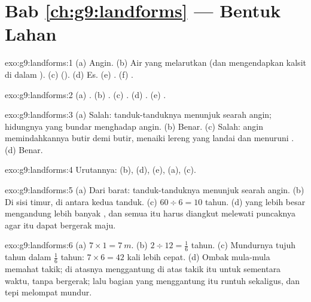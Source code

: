 \section*{Bab \ref{ch:g9:landforms} --- Bentuk Lahan}

\begin{solution}{exo:g9:landforms:1}
(a) Angin. (b) Air yang melarutkan  (dan mengendapkan kalsit di dalam
). (c)  (). (d) Es. (e) . (f) .
\end{solution}

\begin{solution}{exo:g9:landforms:2}
(a) . (b) . (c) . (d) . (e) .
\end{solution}

\begin{solution}{exo:g9:landforms:3}
(a) Salah: tanduk-tanduknya menunjuk searah angin; hidungnya yang bundar
menghadap angin. (b) Benar. (c) Salah: angin memindahkannya butir demi
butir, menaiki lereng yang landai dan menuruni . (d) Benar.
\end{solution}

\begin{solution}{exo:g9:landforms:4}
Urutannya: (b), (d), (e), (a), (c).
\end{solution}

\begin{solution}{exo:g9:landforms:5}
(a) Dari barat: tanduk-tanduknya menunjuk searah angin. (b) Di sisi timur,
di antara kedua tanduk. (c) $60 \div 6 = 10$ tahun. (d)  yang lebih
besar mengandung lebih banyak , dan semua  itu harus diangkut
melewati puncaknya agar  itu dapat bergerak maju.
\end{solution}

\begin{solution}{exo:g9:landforms:6}
(a) $7 \times 1 = \qty{7}{m}$. (b) $2 \div 12 = \frac{1}{6}$ tahun.
(c) Mundurnya tujuh tahun dalam $\frac{1}{6}$ tahun: $7 \times 6 = 42$
kali lebih cepat. (d) Ombak mula-mula memahat takik;  di atasnya
menggantung di atas takik itu untuk sementara waktu, tanpa bergerak; lalu
bagian yang menggantung itu runtuh sekaligus, dan tepi  melompat
mundur.
\end{solution}

